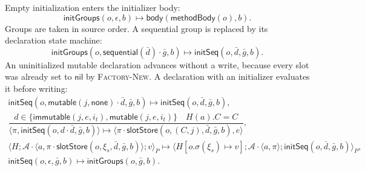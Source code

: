 \documentclass[11pt]{article}
\numberwithin{equation}{section}
\newcommand{\kw}[1]{\ensuremath{\mathsf{#1}}}
\newcommand{\nil}{\kw{nil}}
\newcommand{\rulelabel}[1]{\textsc{#1}}
\begin{document}
Empty initialization enters the initializer body:
\begin{equation}\label{eq:init-groups-empty}
 \kw{initGroups}(o,\epsilon,b)
   \longmapsto\kw{body}(\kw{methodBody}(o),b).
\end{equation}
Groups are taken in source order.  A sequential group is replaced by its
declaration state machine:
\begin{equation}\label{eq:init-group-sequential}
 \kw{initGroups}(o,\kw{sequential}(\bar d)\cdot\bar g,b)
 \longmapsto\kw{initSeq}(o,\bar d,\bar g,b).
\end{equation}
An uninitialized mutable declaration advances without a write, because every
slot was already set to $\nil$ by \rulelabel{Factory-New}.  A declaration with
an initializer evaluates it before writing:
\begin{equation}\label{eq:init-sequential}
\begin{array}{c}
 \kw{initSeq}(o,\kw{mutable}(j,\kw{none})\cdot\bar d,\bar g,b)
 \longmapsto\kw{initSeq}(o,\bar d,\bar g,b),\\[1mm]
\dfrac{d\in\{\kw{immutable}(j,e,i_t),\kw{mutable}(j,e,i_t)\}
        \quad H(a).C=C}
 {\langle\pi,\kw{initSeq}(o,d\cdot\bar d,\bar g,b)\rangle
  \longmapsto
  \langle\pi\cdot\kw{slotStore}(o,(C,j),\bar d,\bar g,b),e\rangle},\\[1mm]
 \langle H;\mathcal A\cdot\langle a,
    \pi\cdot\kw{slotStore}(o,\xi_s,\bar d,\bar g,b)\rangle;v\rangle_P
 \longmapsto
 \langle H[o.\sigma(\xi_s)\mapsto v];\mathcal A\cdot\langle a,\pi\rangle;
    \kw{initSeq}(o,\bar d,\bar g,b)\rangle_P,\\[1mm]
 \kw{initSeq}(o,\epsilon,\bar g,b)
 \longmapsto\kw{initGroups}(o,\bar g,b).
\end{array}
\end{equation}
\end{document}

